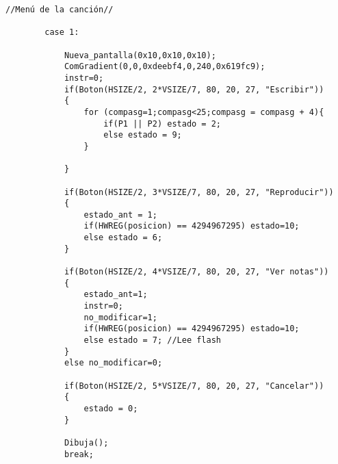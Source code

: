 \documentclass[12pt,a4paper]{article}
\begin{document}
\begin{lstlisting}[basicstyle=\footnotesize] 
            //Menú de la canción//

        case 1:

            Nueva_pantalla(0x10,0x10,0x10);
            ComGradient(0,0,0xdeebf4,0,240,0x619fc9);
            instr=0;
            if(Boton(HSIZE/2, 2*VSIZE/7, 80, 20, 27, "Escribir"))
            {
                for (compasg=1;compasg<25;compasg = compasg + 4){
                    if(P1 || P2) estado = 2;
                    else estado = 9;
                }

            }

            if(Boton(HSIZE/2, 3*VSIZE/7, 80, 20, 27, "Reproducir"))
            {
                estado_ant = 1;
                if(HWREG(posicion) == 4294967295) estado=10;
                else estado = 6;
            }

            if(Boton(HSIZE/2, 4*VSIZE/7, 80, 20, 27, "Ver notas"))
            {
                estado_ant=1;
                instr=0;
                no_modificar=1;
                if(HWREG(posicion) == 4294967295) estado=10;
                else estado = 7; //Lee flash
            }
            else no_modificar=0;

            if(Boton(HSIZE/2, 5*VSIZE/7, 80, 20, 27, "Cancelar"))
            {
                estado = 0;
            }

            Dibuja();
            break;
\end{lstlisting}
\end{document}
